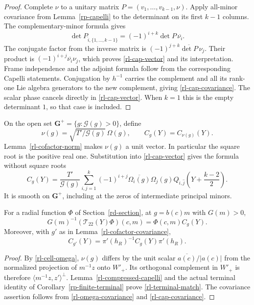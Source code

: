 \begin{proof}
Complete $\nu$ to a unitary matrix
$P=(v_1,\ldots,v_{k-1},\nu)$.
Apply all-minor covariance from Lemma~\ref{rp-capelli}
to the determinant on its first $k-1$ columns.
The complementary-minor formula gives
\[
 \det P_{\widehat i,\{1,\ldots,k-1\}}
                =(-1)^{i+k}\det P\,\overline{\nu_i}.
\]
The conjugate factor from the inverse matrix is
$(-1)^{j+k}\overline{\det P}\,\nu_j$.
Their product is
$(-1)^{i+j}\overline{\nu_i}\nu_j$, which proves
\eqref{rl-cap-vector} and its interpretation.
Frame independence and the adjoint formula follow
from the corresponding Capelli statements.
Conjugation by $h^{-1}$ carries the complement and
all its rank-one Lie algebra generators to the
new complement, giving \eqref{rl-cap-covariance}.
The scalar phase cancels directly in
\eqref{rl-cap-vector}.  When $k=1$ this is the
empty determinant $1$, so that case is included.
\end{proof}

On the open set $\mathbf G^+=\{g:\mathcal G(g)>0\}$,
define
\[
     \nu(g)=\sqrt{T'/\mathcal G(g)}\,\Omega(g),
                   \qquad C_g(Y)=C_{\nu(g)}(Y).
\]
Lemma~\ref{rl-cofactor-norm} makes $\nu(g)$ a unit vector.
In particular the square root is the positive real one.
Substitution into \eqref{rl-cap-vector} gives the
formula without square roots
\begin{equation}\label{rl-rational-matrix}
 C_g(Y)=\frac{T'}{\mathcal G(g)}
        \sum_{i,j=1}^k(-1)^{i+j}
            \overline{\Omega_i(g)}\Omega_j(g)
            Q_{\widehat i,\widehat j}
                   \left(Y+\frac{k-2}{2}\right).
\end{equation}
It is smooth on $\mathbf G^+$, including at the
zeros of intermediate principal minors.

\begin{proposition}\label{rl-actual-terminal-lift}
For a radial function $\Phi$ of Section~\ref{rd-section},
at $g=b(c)m$ with $G(m)>0$,
\begin{equation}\label{rl-terminal-match}
   G(m)^{-1}(\mathcal T_{22}(Y)\Phi)(c,m)
                              =\Phi(c,m)C_g(Y).
\end{equation}
Moreover, with $g'$ as in Lemma~\ref{rl-cofactor-covariance},
\[
                C_{g'}(Y)=\pi'(h_R)^{-1}C_g(Y)\pi'(h_R).
\]
\end{proposition}

\begin{proof}
By \eqref{rl-cell-omega}, $\nu(g)$ differs by the
unit scalar $\overline{a(c)}/|a(c)|$ from the
normalized projection of $m^{-1}z$ onto $W'_+$.
Its orthogonal complement in $W'_+$ is therefore
$\langle m^{-1}z,z'\rangle^\perp$.
Lemma~\ref{rl-compressed-capelli} and the actual terminal
identity of Corollary~\ref{rp-finite-terminal} prove
\eqref{rl-terminal-match}.
The covariance assertion follows from
\eqref{rl-omega-covariance} and
\eqref{rl-cap-covariance}.
\end{proof}

